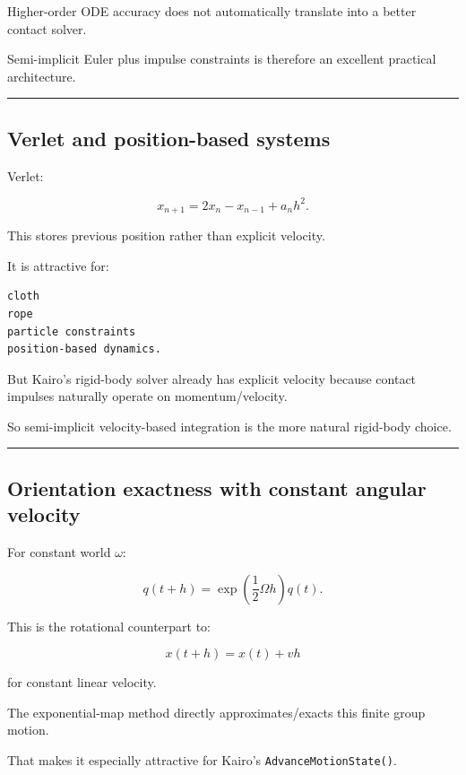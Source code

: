 Higher-order ODE accuracy does not automatically translate into a better contact solver.

Semi-implicit Euler plus impulse constraints is therefore an excellent practical architecture.

\begin{center}\rule{0.5\linewidth}{0.5pt}\end{center}

\subsection{Verlet and position-based systems}\label{06-engine-ii-ch038-verlet-and-position-based-systems}

Verlet:

\[
x_{n+1}
=
2x_n-x_{n-1}+a_nh^2.
\]

This stores previous position rather than explicit velocity.

It is attractive for:

\begin{verbatim}
cloth
rope
particle constraints
position-based dynamics.
\end{verbatim}

But Kairo's rigid-body solver already has explicit velocity because contact impulses naturally operate on momentum/velocity.

So semi-implicit velocity-based integration is the more natural rigid-body choice.

\begin{center}\rule{0.5\linewidth}{0.5pt}\end{center}

\subsection{Orientation exactness with constant angular velocity}\label{06-engine-ii-ch038-orientation-exactness-with-constant-angular-velocity}

For constant world \(\omega\):

\[
q(t+h)
=
\exp\left(
\frac12\Omega h
\right)
q(t).
\]

This is the rotational counterpart to:

\[
x(t+h)
=
x(t)+vh
\]

for constant linear velocity.

The exponential-map method directly approximates/exacts this finite group motion.

That makes it especially attractive for Kairo's \texttt{AdvanceMotionState()}.

